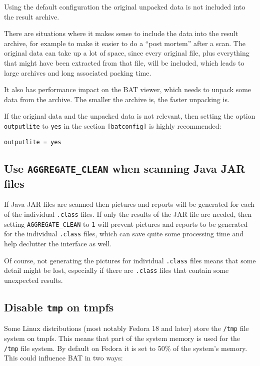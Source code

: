 \documentclass[10pt,a4paper]{article}
\begin{document}
Using the default configuration the original unpacked data is not included into
the result archive.

There are situations where it makes sense to include the data into the result
archive, for example to make it easier to do a ``post mortem'' after a scan.
The original data can take up a lot of space, since every original file, plus
everything that might have been extracted from that file, will be included,
which leads to large archives and long associated packing time.

It also has performance impact on the BAT viewer, which needs to unpack some
data from the archive. The smaller the archive is, the faster unpacking is.

If the original data and the unpacked data is not relevant, then setting the
option \texttt{outputlite} to \texttt{yes} in the section \texttt{[batconfig]}
is highly recommended:

\begin{verbatim}
outputlite = yes
\end{verbatim}

\subsection{Use \texttt{AGGREGATE\_CLEAN} when scanning Java JAR files}

If Java JAR files are scanned then pictures and reports will be generated for
each of the individual \texttt{.class} files. If only the results of the JAR
file are needed, then setting \texttt{AGGREGATE\_CLEAN} to \texttt{1} will
prevent pictures and reports to be generated for the individual \texttt{.class}
files, which can save quite some processing time and help declutter the
interface as well.

Of course, not generating the pictures for individual \texttt{.class} files
means that some detail might be lost, especially if there are \texttt{.class}
files that contain some unexpected results.

\subsection{Disable \texttt{tmp} on tmpfs}

Some Linux distributions (most notably Fedora 18 and later) store the
\texttt{/tmp} file system on tmpfs. This means that part of the system memory
is used for the \texttt{/tmp} file system. By default on Fedora it is
set to 50\% of the system's memory. This could influence BAT in two ways:
\end{document}
